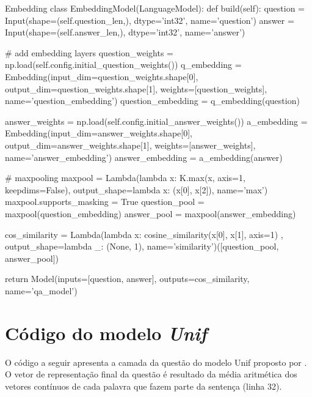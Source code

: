 \begin{mypython-linenumber}{Embedding}
class EmbeddingModel(LanguageModel):
    def build(self):
        question = Input(shape=(self.question_len,), dtype='int32', name='question')
        answer = Input(shape=(self.answer_len,), dtype='int32', name='answer')

        # add embedding layers
        question_weights = np.load(self.config.initial_question_weights())
        q_embedding = Embedding(input_dim=question_weights.shape[0],
                                output_dim=question_weights.shape[1],
                                weights=[question_weights],
                                name='question_embedding')
        question_embedding = q_embedding(question)

        answer_weights = np.load(self.config.initial_answer_weights())
        a_embedding = Embedding(input_dim=answer_weights.shape[0],
                                output_dim=answer_weights.shape[1],
                                weights=[answer_weights],
                                name='answer_embedding')
        answer_embedding = a_embedding(answer)

        # maxpooling
        maxpool = Lambda(lambda x: K.max(x, axis=1, keepdims=False), output_shape=lambda x: (x[0], x[2]),
                         name='max')
        maxpool.supports_masking = True
        question_pool = maxpool(question_embedding)
        answer_pool = maxpool(answer_embedding)
        
        cos_similarity = Lambda(lambda x: cosine_similarity(x[0], x[1], axis=1)
                                       , output_shape=lambda _: (None, 1), name='similarity')([question_pool,
                                                                                               answer_pool])

        return Model(inputs=[question, answer], outputs=cos_similarity,
                                   name='qa_model')

\end{mypython-linenumber}

\vspace{2cm}

\section{Código do modelo \textit{Unif}}

O código a seguir apresenta a camada da questão do modelo Unif proposto por . O vetor de representação final da questão é resultado da média aritmética dos vetores contínuos de cada palavra que fazem parte da sentença (linha 32).

